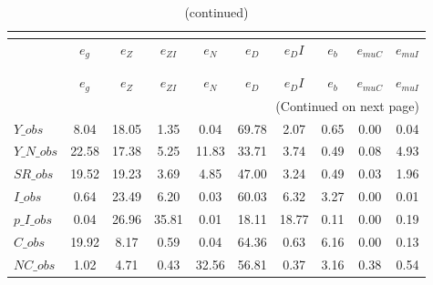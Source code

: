  
\begin{center}
\begin{longtable}{lccccccccc} 
\caption{VARIANCE DECOMPOSITION (in percent)}\\
 \label{Table:th_var_decomp_uncond}\\
\toprule 
$               $	 & 	 $        {e_g}$	 & 	 $        {e_Z}$	 & 	 $     {e_{ZI}}$	 & 	 $        {e_N}$	 & 	 $        {e_D}$	 & 	 $       {e_DI}$	 & 	 $        {e_b}$	 & 	 $    {e_{muC}}$	 & 	 $    {e_{muI}}$\\
\midrule \endfirsthead 
\caption{(continued)}\\
 \toprule \\ 
$               $	 & 	 $        {e_g}$	 & 	 $        {e_Z}$	 & 	 $     {e_{ZI}}$	 & 	 $        {e_N}$	 & 	 $        {e_D}$	 & 	 $       {e_DI}$	 & 	 $        {e_b}$	 & 	 $    {e_{muC}}$	 & 	 $    {e_{muI}}$\\
\midrule \endhead 
\midrule \multicolumn{10}{r}{(Continued on next page)} \\ \bottomrule \endfoot 
\bottomrule \endlastfoot 
$Y\_obs         $	 & 	         8.04	 & 	        18.05	 & 	         1.35	 & 	         0.04	 & 	        69.78	 & 	         2.07	 & 	         0.65	 & 	         0.00	 & 	         0.04 \\ 
$Y\_N\_obs      $	 & 	        22.58	 & 	        17.38	 & 	         5.25	 & 	        11.83	 & 	        33.71	 & 	         3.74	 & 	         0.49	 & 	         0.08	 & 	         4.93 \\ 
$SR\_obs        $	 & 	        19.52	 & 	        19.23	 & 	         3.69	 & 	         4.85	 & 	        47.00	 & 	         3.24	 & 	         0.49	 & 	         0.03	 & 	         1.96 \\ 
$I\_obs         $	 & 	         0.64	 & 	        23.49	 & 	         6.20	 & 	         0.03	 & 	        60.03	 & 	         6.32	 & 	         3.27	 & 	         0.00	 & 	         0.01 \\ 
$p\_I\_obs      $	 & 	         0.04	 & 	        26.96	 & 	        35.81	 & 	         0.01	 & 	        18.11	 & 	        18.77	 & 	         0.11	 & 	         0.00	 & 	         0.19 \\ 
$C\_obs         $	 & 	        19.92	 & 	         8.17	 & 	         0.59	 & 	         0.04	 & 	        64.36	 & 	         0.63	 & 	         6.16	 & 	         0.00	 & 	         0.13 \\ 
$NC\_obs        $	 & 	         1.02	 & 	         4.71	 & 	         0.43	 & 	        32.56	 & 	        56.81	 & 	         0.37	 & 	         3.16	 & 	         0.38	 & 	         0.54 \\ 

\end{longtable}
\end{center}
